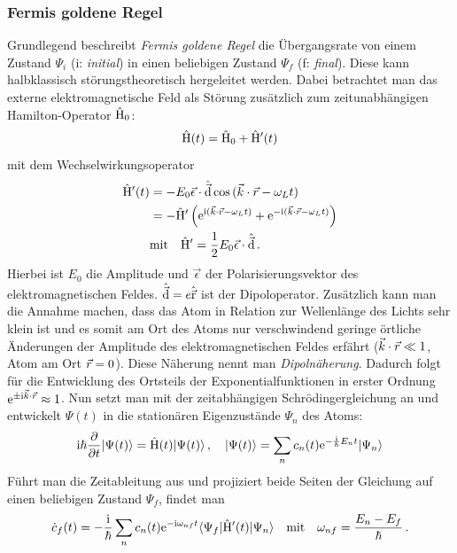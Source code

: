 \subsubsection{Fermis goldene Regel}\label{subsubsec:fermis_goldene_regel}
Grundlegend beschreibt \textit{Fermis goldene Regel} die
Übergangsrate von einem Zustand $\Psi_i$ (i: \textit{initial}) in einen
beliebigen Zustand $\Psi_f$ (f: \textit{final}). Diese kann halbklassisch
störungstheoretisch hergeleitet werden.  Dabei betrachtet man das externe elektromagnetische Feld als Störung
zusätzlich zum zeitunabhängigen Hamilton-Operator $\hat{\mathrm{H}}_0$:
\begin{equation}\label{eq:hamilton}
	\hat{\mathrm{H}}(t)=\hat{\mathrm{H}}_0+\hat{\mathrm{H}}'(t)
\end{equation}
mit dem Wechselwirkungsoperator
\begin{equation}\label{eq:ww}
	\begin{split}
		\hat{\mathrm{H}}'(t) &= -E_0\vec{\epsilon}\cdot\hat{\vec{\mathrm{d}}}\cos{(\vec{k}\cdot\vec{r}-\omega_L t)}\\
		&=
		-\hat{\mathrm{H}}'\left(\mathrm{e}^{\mathrm{i}(\vec{k}\cdot\vec{r}-\omega_L
		t)}+\mathrm{e}^{-\mathrm{i}(\vec{k}\cdot\vec{r}-\omega_L t)}\right)\\
		&\text{mit}\quad
		\hat{\mathrm{H}}'=\frac{1}{2}E_0\vec{\epsilon}\cdot\hat{\vec{\mathrm{d}}}\,.
	\end{split}
\end{equation}
Hierbei ist $E_0$ die Amplitude und $\vec{\epsilon}$ der
Polarisierungsvektor des elektromagnetischen Feldes. $\hat{\vec{\mathrm{d}}} = e\hat{\vec{\mathrm{r}}}$ ist
der Dipoloperator. Zusätzlich kann man die Annahme machen, dass das Atom in Relation zur
Wellenlänge des Lichts sehr klein ist und es somit am Ort
des Atoms nur verschwindend geringe örtliche Änderungen der Amplitude des
elektromagnetischen Feldes erfährt ($\vec{k}\cdot\vec{r}\ll 1$, Atom am Ort $\vec{r}=0$). Diese Näherung nennt man
\textit{Dipolnäherung}. Dadurch folgt für die Entwicklung des
Ortsteils der Exponentialfunktionen in erster Ordnung
$\mathrm{e}^{\pm\mathrm{i}\vec{k}\cdot\vec{r}}\approx1$. Nun setzt man mit der zeitabhängigen Schrödingergleichung an und entwickelt $\Psi(t)$ in die stationären Eigenzustände $\Psi_n$ des Atoms:
\begin{equation}\label{eq:sgl_stoerung_01}
	\mathrm{i}\hbar\frac{\partial }{\partial t}|{\Psi(t)}\rangle=\hat{\mathrm{H}}(t)|{\Psi(t)}\rangle\,,
	\quad
	|{\Psi(t)}\rangle=\sum\limits_n{c_n(t)\mathrm{e}^{-\frac{\mathrm{i}}{\hbar} E_n
	t}|{\Psi_n}\rangle}
\end{equation}
Führt man die Zeitableitung aus und projiziert beide Seiten der Gleichung auf
einen beliebigen Zustand $\Psi_f$, findet man
\begin{equation}\label{eq:sgl_stoerung_02}
	\dot
	c_f(t)=-\frac{\mathrm{i}}{\hbar}\sum\limits_n{c_n(t)\mathrm{e}^{-\mathrm{i}\omega_{nf}t}\langle{\Psi_f}|\hat{\mathrm{H}}'(t)|{\Psi_n}\rangle}
	\quad\text{mit}\quad
	\omega_{nf}=\frac{E_n-E_f}{\hbar}\,.
\end{equation}
